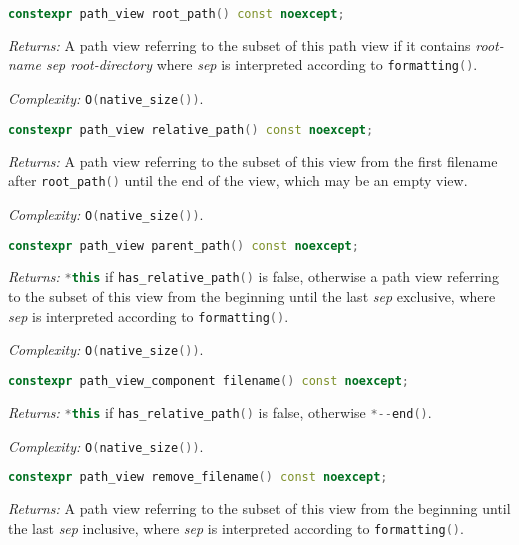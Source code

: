 \documentclass[11pt]{article}
\newcommand{\code}[2][cpp]{\lstinline[language=#1,basicstyle=\small\ttfamily]{#2}}
\newcommand{\desc}[1]{\textit{#1}}
\newcommand{\returns}{\desc{Returns: }}
\newcommand{\complexity}{\desc{Complexity: }}
\begin{document}
\begin{lstlisting}[language=cpp]
    constexpr path_view root_path() const noexcept;
\end{lstlisting}

\returns A path view referring to the subset of this path view if it contains \emph{root-name sep root-directory} where \emph{sep} is interpreted according to \code{formatting()}.

\complexity \code{O(native_size())}.\\

\begin{lstlisting}[language=cpp]
    constexpr path_view relative_path() const noexcept;
\end{lstlisting}

\returns A path view referring to the subset of this view from the first filename after \code{root_path()} until the end of the view, which may be an empty view.

\complexity \code{O(native_size())}.\\

\begin{lstlisting}[language=cpp]
    constexpr path_view parent_path() const noexcept;
\end{lstlisting}

\returns \code{*this} if \code{has_relative_path()} is false, otherwise a path view referring to the subset of this view from the beginning until the last \emph{sep} exclusive, where \emph{sep} is interpreted according to \code{formatting()}.

\complexity \code{O(native_size())}.\\

\begin{lstlisting}[language=cpp]
    constexpr path_view_component filename() const noexcept;
\end{lstlisting}

\returns \code{*this} if \code{has_relative_path()} is false, otherwise \code{*--end()}.

\complexity \code{O(native_size())}.\\

\begin{lstlisting}[language=cpp]
    constexpr path_view remove_filename() const noexcept;
\end{lstlisting}

\returns A path view referring to the subset of this view from the beginning until the last \emph{sep} inclusive, where \emph{sep} is interpreted according to \code{formatting()}.
\end{document}
